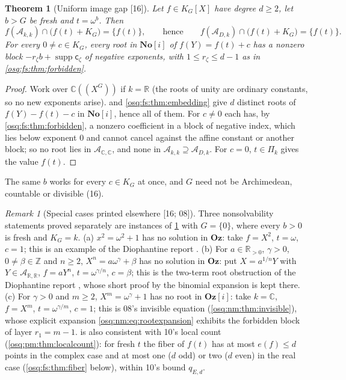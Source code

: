 \documentclass[11pt,letterpaper]{article}
\numberwithin{equation}{section}
\newtheorem{theorem}{Theorem}[section]
\theoremstyle{definition}
\theoremstyle{remark}
\newtheorem{remark}[remark]{Remark}
\theoremstyle{plain}
\newcommand{\No}{\mathbf{No}}
\newcommand{\Oz}{\mathbf{Oz}}
\newcommand{\SC}{\No[i]}
\newcommand{\GOz}{\Oz[i]}
\newcommand{\Z}{\mathbb Z}
\newcommand{\R}{\mathbb R}
\newcommand{\C}{\mathbb C}
\newcommand{\A}{\mathcal A}          %
\newcommand{\hahn}[2]{#1(\!(X^{#2})\!)}
\newcommand{\supp}{\operatorname{supp}}
\newcommand{\src}[1]{\textup{\textsf{[#1]}}}
\begin{document}
\begin{theorem}[Uniform image gap \src{16}]\label{osq:fs:thm:imagegap}
Let $f\in K_G[X]$ have degree $d\ge2$, let $b>G$ be fresh and $t=\omega^b$. Then
\[
 f(\A_{k,k})\cap\bigl(f(t)+K_G\bigr)=\{f(t)\},\qquad\text{hence}\qquad f(\A_{D,k})\cap\bigl(f(t)+K_G\bigr)=\{f(t)\}.
\]
For every $0\ne c\in K_G$, every root in $\SC$ of $f(Y)=f(t)+c$ has a nonzero block $-r_\zeta b+\supp\mathsf c_\zeta$ of negative
exponents, with $1\le r_\zeta\le d-1$ as in \cref{osq:fs:thm:forbidden}.
\end{theorem}
\begin{proof}
Work over $\hahn\C G$ if $k=\R$ (the roots of unity are ordinary constants, so no new exponents arise).  and
\cref{osq:fs:thm:embedding} give $d$ distinct roots of $f(Y)-f(t)-c$ in $\SC$, hence all of them. For $c\ne0$ each has, by
\cref{osq:fs:thm:forbidden}, a nonzero coefficient in a block of negative index, which lies below exponent $0$ and cannot cancel against the
affine constant or another block; so no root lies in $\A_{\C,\C}$, and none in $\A_{k,k}\supseteq\A_{D,k}$. For $c=0$, $t\in\Pi_k$ gives the value
$f(t)$.
\end{proof}

The same $b$ works for every $c\in K_G$ at once, and $G$ need not be Archimedean, countable or divisible (16).

\begin{remark}[Special cases printed elsewhere \src{16; 08}]\label{osq:fs:rem:special}
Three nonsolvability statements proved separately are instances of \cref{osq:fs:thm:imagegap} with $G=\{0\}$, where every $b>0$ is
fresh and $K_G=k$. (a) $x^2=\omega^2+1$ has no solution in $\Oz$: take $f=X^2$, $t=\omega$, $c=1$; this is an example of the
Diophantine report \cite{RepoOdg}. (b) For $a\in\R_{>0}$, $\gamma>0$, $0\ne\beta\in\Z$ and $n\ge2$, $X^n=a\omega^\gamma+\beta$ has
no solution in $\Oz$: put $X=a^{1/n}Y$ with $Y\in\A_{\R,\R}$, $f=aY^n$, $t=\omega^{\gamma/n}$, $c=\beta$; this is the two-term root obstruction of
the Diophantine report \cite{RepoOdg}, whose short proof by the binomial expansion is kept there. (c) For $\gamma>0$ and $m\ge2$,
$X^m=\omega^\gamma+1$ has no root in $\GOz$: take $k=\C$, $f=X^m$, $t=\omega^{\gamma/m}$, $c=1$; this is 08's invisible equation
(\cref{osq:nm:thm:invisible}), whose explicit expansion \eqref{osq:nm:eq:rootexpansion} exhibits the forbidden block of layer $r_1=m-1$.
 is also consistent with 10's local count (\cref{osq:pm:thm:localcount}): for fresh $t$ the fiber of $f(t)$ has
at most $e(f)\le d$ points in the complex case and at most one ($d$ odd) or two ($d$ even) in the real case (\cref{osq:fs:thm:fiber} below),
within 10's bound $q_{E,d}$.
\end{remark}
\end{document}
